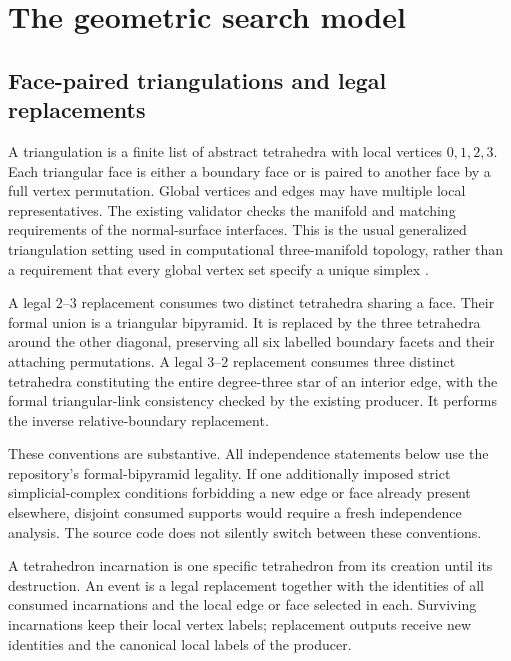 \section{The geometric search model}\label{sec:model}

\subsection{Face-paired triangulations and legal replacements}

A triangulation is a finite list of abstract tetrahedra with local vertices
$0,1,2,3$. Each triangular face is either a boundary face or is paired to
another face by a full vertex permutation. Global vertices and edges may
have multiple local representatives. The existing validator checks the
manifold and matching requirements of the normal-surface interfaces.
This is the usual generalized triangulation setting used in computational
three-manifold topology, rather than a requirement that every global vertex
set specify a unique simplex \cite{BurtonPachner}.

A legal $2$--$3$ replacement consumes two distinct tetrahedra sharing a face.
Their formal union is a triangular bipyramid. It is replaced by the three
tetrahedra around the other diagonal, preserving all six labelled boundary
facets and their attaching permutations. A legal $3$--$2$ replacement consumes
three distinct tetrahedra constituting the entire degree-three star of an
interior edge, with the formal triangular-link consistency checked by the
existing producer. It performs the inverse relative-boundary replacement.

These conventions are substantive. All independence statements below use the
repository's formal-bipyramid legality. If one additionally imposed strict
simplicial-complex conditions forbidding a new edge or face already present
elsewhere, disjoint consumed supports would require a fresh independence
analysis. The source code does not silently switch between these conventions.

\begin{definition}
A tetrahedron incarnation is one specific tetrahedron from its creation until
its destruction. An event is a legal replacement together with the identities
of all consumed incarnations and the local edge or face selected in each.
Surviving incarnations keep their local vertex labels; replacement outputs
receive new identities and the canonical local labels of the producer.
\end{definition}

